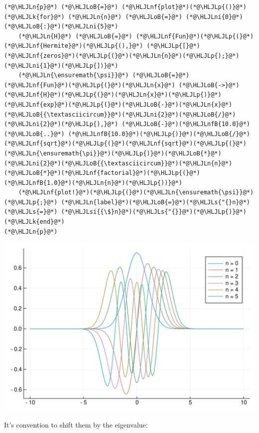 \documentclass[12pt,a4paper]{article}
\newcommand{\HLJLk}[1]{\textcolor[RGB]{148,91,176}{\textbf{#1}}}
\newcommand{\HLJLn}[1]{#1}
\newcommand{\HLJLnf}[1]{\textcolor[RGB]{66,102,213}{#1}}
\newcommand{\HLJLs}[1]{\textcolor[RGB]{201,61,57}{#1}}
\newcommand{\HLJLsi}[1]{#1}
\newcommand{\HLJLnfB}[1]{\textcolor[RGB]{59,151,46}{#1}}
\newcommand{\HLJLni}[1]{\textcolor[RGB]{59,151,46}{#1}}
\newcommand{\HLJLoB}[1]{\textcolor[RGB]{102,102,102}{\textbf{#1}}}
\newcommand{\HLJLp}[1]{#1}
\begin{document}
\begin{lstlisting}
(*@\HLJLn{p}@*) (*@\HLJLoB{=}@*) (*@\HLJLnf{plot}@*)(*@\HLJLp{()}@*)
(*@\HLJLk{for}@*) (*@\HLJLn{n}@*) (*@\HLJLoB{=}@*) (*@\HLJLni{0}@*)(*@\HLJLoB{:}@*)(*@\HLJLni{5}@*)
    (*@\HLJLn{H}@*) (*@\HLJLoB{=}@*) (*@\HLJLnf{Fun}@*)(*@\HLJLp{(}@*)(*@\HLJLnf{Hermite}@*)(*@\HLJLp{(),}@*) (*@\HLJLp{[}@*)(*@\HLJLnf{zeros}@*)(*@\HLJLp{(}@*)(*@\HLJLn{n}@*)(*@\HLJLp{);}@*)(*@\HLJLni{1}@*)(*@\HLJLp{])}@*)
    (*@\HLJLn{\ensuremath{\psi}}@*) (*@\HLJLoB{=}@*) (*@\HLJLnf{Fun}@*)(*@\HLJLp{(}@*)(*@\HLJLn{x}@*) (*@\HLJLoB{->}@*) (*@\HLJLnf{H}@*)(*@\HLJLp{(}@*)(*@\HLJLn{x}@*)(*@\HLJLp{)}@*)(*@\HLJLnf{exp}@*)(*@\HLJLp{(}@*)(*@\HLJLoB{-}@*)(*@\HLJLn{x}@*)(*@\HLJLoB{{\textasciicircum}}@*)(*@\HLJLni{2}@*)(*@\HLJLoB{/}@*)(*@\HLJLni{2}@*)(*@\HLJLp{),}@*) (*@\HLJLoB{-}@*)(*@\HLJLnfB{10.0}@*) (*@\HLJLoB{..}@*) (*@\HLJLnfB{10.0}@*)(*@\HLJLp{)}@*)(*@\HLJLoB{/}@*)(*@\HLJLnf{sqrt}@*)(*@\HLJLp{(}@*)(*@\HLJLnf{sqrt}@*)(*@\HLJLp{(}@*)(*@\HLJLn{\ensuremath{\pi}}@*)(*@\HLJLp{)}@*)(*@\HLJLoB{*}@*)(*@\HLJLni{2}@*)(*@\HLJLoB{{\textasciicircum}}@*)(*@\HLJLn{n}@*)(*@\HLJLoB{*}@*)(*@\HLJLnf{factorial}@*)(*@\HLJLp{(}@*)(*@\HLJLnfB{1.0}@*)(*@\HLJLn{n}@*)(*@\HLJLp{))}@*)
    (*@\HLJLnf{plot!}@*)(*@\HLJLp{(}@*)(*@\HLJLn{\ensuremath{\psi}}@*)(*@\HLJLp{;}@*) (*@\HLJLn{label}@*)(*@\HLJLoB{=}@*)(*@\HLJLs{"{}n}@*) (*@\HLJLs{=}@*) (*@\HLJLsi{{\$}n}@*)(*@\HLJLs{"{}}@*)(*@\HLJLp{)}@*)
(*@\HLJLk{end}@*)
(*@\HLJLn{p}@*)
\end{lstlisting}

\includegraphics[width=\linewidth]{figures/Lecture24_7_1.pdf}

It's convention to shift them by the eigenvalue:
\end{document}
